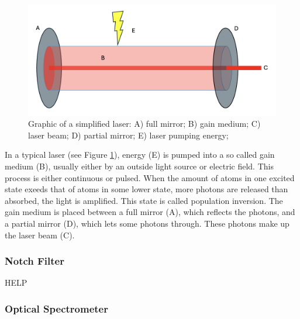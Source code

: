 \begin{figure}[ht]
    \centering
    \includegraphics[width=\textwidth]{images/setup_graphics/laser.png}
    \caption{Graphic of a simplified laser: A) full mirror; B) gain medium; C) laser beam; D) partial mirror; E) laser pumping energy;}
    \label{fig:laser}
\end{figure}


In a typical laser (see Figure \ref{fig:laser}), energy (E) is pumped into a so called gain medium (B), usually either by an outside light source or electric field. This process is either continuous or pulsed. When the amount of atoms in one excited state exeeds that of atoms in some lower state, more photons are released than absorbed, the light is amplified. This state is called population inversion. The gain medium is placed between a full mirror (A), which reflects the photons, and a partial mirror (D), which lets some photons through. These photons make up the laser beam (C).\cite{wikilaser} \cite{wikistimlaser}

\newpage

\subsubsection{Notch Filter}
HELP

\newpage
\subsubsection{Optical Spectrometer}



